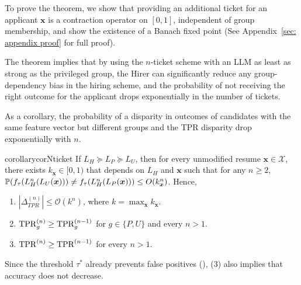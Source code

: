 To prove the theorem, we show that providing an additional ticket for an applicant $\bm x$ is a contraction operator on $[0,1]$, independent of group membership, and show the existence of a Banach fixed point (See Appendix~\ref{sec: appendix proof} for full proof).


The theorem implies that by using the $n$-ticket scheme with an LLM as least as strong as the privileged group, the Hirer can significantly reduce any group-dependency bias in the hiring scheme, and the probability of not receiving the right outcome for the applicant drops exponentially in the number of tickets.

As a corollary, the probability of a disparity in outcomes of candidates with the same feature vector but different groups and the TPR disparity drop exponentially with $n$.

\begin{restatable}{corollary}{corNticket}
            \label{cor: n-ticket}
    If $L_H \succeq L_P \succeq L_U$, then for every unmodified resume $\bm x\in \mathcal{X}$, there exists  $k_{\bm x}\in[0,1)$ that depends on $L_H$ and $\bm x$ such that for any $n\geq 2$, 
    $\operatorname*{\mathbb{P}}(f_\tau(L_H^{n}(L_U(\bm{x}))) \ne f_\tau(L_H^{n}(L_P(\bm{x})))\leq O(k_{\bm x}^n)$. Hence, 
    \begin{enumerate}
        \item $|\Delta_{TPR}^{(n)}|\leq \mathcal{O}(k^n)$,    
    where $k=\max_{\bm x} k_{\bm x}$.
    \item  \(\mathrm{TPR}_g^{(n)} \geq \mathrm{TPR}_g^{(n-1)}\) for \(g \in \{P, U\}\) and every $n> 1$.
    \item \(\mathrm{TPR}^{(n)} \geq \mathrm{TPR}^{(n-1)}\) for every $n> 1$. 
    \end{enumerate}
Since the threshold $\tau^*$ already prevents false positives (), (3) also implies that accuracy does not decrease.
\end{restatable}








